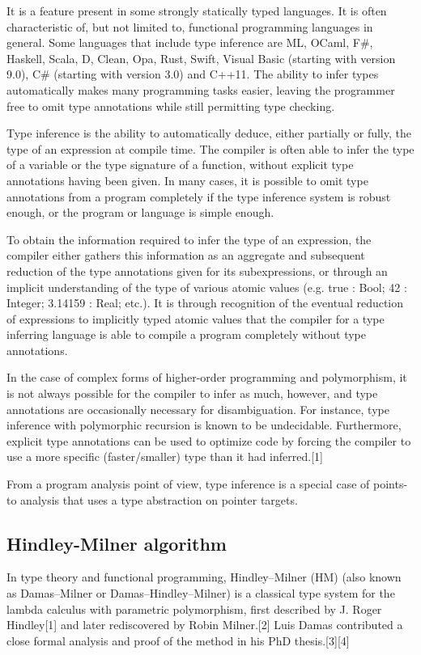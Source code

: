 \documentclass[12pt,b5paper]{book}
\theoremstyle{definition}
\begin{document}
It is a feature present in some strongly statically typed languages. It is often characteristic of, but not limited to, functional programming languages in general. Some languages that include type inference are ML, OCaml, F\#, Haskell, Scala, D, Clean, Opa, Rust, Swift, Visual Basic (starting with version 9.0), C\# (starting with version 3.0) and C++11. The ability to infer types automatically makes many programming tasks easier, leaving the programmer free to omit type annotations while still permitting type checking.


Type inference is the ability to automatically deduce, either partially or fully, the type of an expression at compile time. The compiler is often able to infer the type of a variable or the type signature of a function, without explicit type annotations having been given. In many cases, it is possible to omit type annotations from a program completely if the type inference system is robust enough, or the program or language is simple enough.

To obtain the information required to infer the type of an expression, the compiler either gathers this information as an aggregate and subsequent reduction of the type annotations given for its subexpressions, or through an implicit understanding of the type of various atomic values (e.g. true : Bool; 42 : Integer; 3.14159 : Real; etc.). It is through recognition of the eventual reduction of expressions to implicitly typed atomic values that the compiler for a type inferring language is able to compile a program completely without type annotations.

In the case of complex forms of higher-order programming and polymorphism, it is not always possible for the compiler to infer as much, however, and type annotations are occasionally necessary for disambiguation. For instance, type inference with polymorphic recursion is known to be undecidable. Furthermore, explicit type annotations can be used to optimize code by forcing the compiler to use a more specific (faster/smaller) type than it had inferred.[1]

From a program analysis point of view, type inference is a special case of points-to analysis that uses a type abstraction on pointer targets.

\subsection{Hindley-Milner algorithm}
In type theory and functional programming, Hindley–Milner (HM) (also known as Damas–Milner or Damas–Hindley–Milner) is a classical type system for the lambda calculus with parametric polymorphism, first described by J. Roger Hindley[1] and later rediscovered by Robin Milner.[2] Luis Damas contributed a close formal analysis and proof of the method in his PhD thesis.[3][4]
\end{document}
